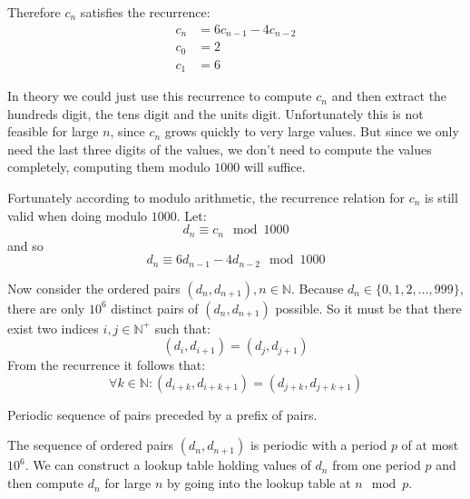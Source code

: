 \noindent Therefore $c_n$ satisfies the recurrence:
\[
\begin{split}
	c_n & = 6 c_{n-1} - 4 c_{n -2} \\
	c_0 & = 2 \\
	c_1 & = 6
\end{split}
\]

In theory we could just use this recurrence to compute $c_n$ and then extract the hundreds digit, the tens digit and the units digit. Unfortunately this is not feasible for large $n$, since $c_n$ grows quickly to very large values. But since we only need the last three digits of the values,  we don't need to compute the values completely, computing them modulo $1000$ will suffice. 

Fortunately according to modulo arithmetic, the recurrence relation for $c_n$ is still valid when doing modulo $1000$. Let:
\[
	d_n \equiv c_n \mod{1000}
\]
and so
\[
	d_n \equiv 6 d_{n-1} - 4 d_{n -2} \mod{1000}
\]	 

\noindent Now consider the ordered pairs $(d_n, d_{n+1}), n \in \mathbb{N}$. Because $d_n \in \{0, 1, 2, \ldots, 999\}$, there are only $10^6$ distinct pairs of $(d_n, d_{n+1})$ possible. So it must be that there exist two indices $i, j \in \mathbb{N}^+$ such that:
\[
	(d_i, d_{i+1}) = (d_j, d_{j+1})
\]
\noindent From the recurrence it  follows that:
\[
	\forall k \in \mathbb{N}: (d_{i+k}, d_{i + k + 1}) = (d_{j + k}, d_{j + k + 1})
\]

\begin{marginfigure}[1.0in]
\caption{Periodic sequence of pairs preceded by a prefix of pairs.}
\label{fig:looppairs}
\end{marginfigure}

The sequence of ordered pairs $(d_n, d_{n+1})$ is periodic with a period $p$ of at most $10^6$. We can construct a lookup table holding values of $d_n$ from one period $p$ and then compute $d_n$ for large $n$ by going into the lookup table at $n \mod{p}$.

